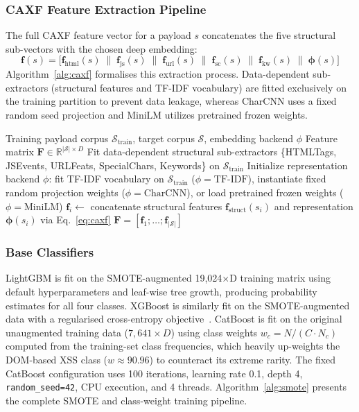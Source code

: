 \documentclass[11pt,a4paper]{article}
\begin{document}
\subsubsection{CAXF Feature Extraction Pipeline}

The full CAXF feature vector for a payload $s$ concatenates the five structural sub-vectors with the chosen deep embedding:
\begin{equation}
  \mathbf{f}(s) = \bigl[\mathbf{f}_{\text{html}}(s) \;\|\;
    \mathbf{f}_{\text{js}}(s) \;\|\;
    \mathbf{f}_{\text{url}}(s) \;\|\;
    \mathbf{f}_{\text{sc}}(s) \;\|\;
    \mathbf{f}_{\text{kw}}(s) \;\|\;
    \boldsymbol{\phi}(s)\bigr]
  \label{eq:caxf}
\end{equation}
Algorithm~\ref{alg:caxf} formalises this extraction process. Data-dependent sub-extractors (structural features and TF-IDF vocabulary) are fitted exclusively on the training partition to prevent data leakage, whereas CharCNN uses a fixed random seed projection and MiniLM utilizes pretrained frozen weights.

\begin{algorithm}[ht]
\caption{CAXF Feature Extraction Pipeline}
\label{alg:caxf}
\begin{algorithmic}[1]
\REQUIRE Training payload corpus $\mathcal{S}_{\text{train}}$, target corpus $\mathcal{S}$, embedding backend $\phi$
\ENSURE Feature matrix $\mathbf{F} \in \mathbb{R}^{|\mathcal{S}| \times D}$
\STATE Fit data-dependent structural sub-extractors \{HTMLTags, JSEvents, URLFeats, SpecialChars, Keywords\} on $\mathcal{S}_{\text{train}}$
\STATE Initialize representation backend $\phi$: fit TF-IDF vocabulary on $\mathcal{S}_{\text{train}}$ ($\phi = \text{TF-IDF}$), instantiate fixed random projection weights ($\phi = \text{CharCNN}$), or load pretrained frozen weights ($\phi = \text{MiniLM}$)
  \STATE $\mathbf{f}_i \leftarrow$ concatenate structural features $\mathbf{f}_{\text{struct}}(s_i)$ and representation $\boldsymbol{\phi}(s_i)$ via Eq.~\ref{eq:caxf}
\ENDFOR
\RETURN $\mathbf{F} = [\mathbf{f}_1;\ldots;\mathbf{f}_{|\mathcal{S}|}]$
\end{algorithmic}
\end{algorithm}

\subsubsection{Base Classifiers}

LightGBM is fit on the SMOTE-augmented 19,024$\times$D training matrix using default
hyperparameters and leaf-wise tree growth, producing probability estimates for all four classes.
XGBoost is similarly fit on the SMOTE-augmented data with a regularised cross-entropy
objective~\cite{xgboost2016}. CatBoost is fit on the original unaugmented training data
($7{,}641 \times D$) using class weights $w_c = N/(C \cdot N_c)$ computed from the training-set
class frequencies, which heavily up-weights the DOM-based XSS class ($w \approx 90.96$) to
counteract its extreme rarity. The fixed CatBoost configuration uses 100 iterations, learning rate
0.1, depth 4, \texttt{random\_seed=42}, CPU execution, and 4 threads. Algorithm~\ref{alg:smote} presents the complete SMOTE and class-weight training pipeline.
\end{document}

